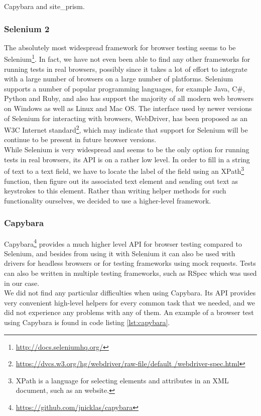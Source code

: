 Capybara and site\_prism.

\subsubsection{Selenium 2}
The absolutely most widespread framework for browser testing seems to be
Selenium\footnote{\url{http://docs.seleniumhq.org/}}. In fact, we have
not even been able to find any other frameworks for running tests in
real browsers, possibly since it takes a lot of effort to integrate with
a large number of browsers on a large number of platforms. Selenium
supports a number of popular programming languages, for example Java,
C\#, Python and Ruby, and also has support the majority of all modern web
browsers on Windows as well as Linux and Mac OS. The interface used by
newer versions of Selenium for interacting with browsers, WebDriver, has
been proposed as an W3C Internet
standard\footnote{\url{https://dvcs.w3.org/hg/webdriver/raw-file/default
/webdriver-spec.html}}, which may indicate that support for Selenium
will be continue to be present in future browser versions.
\cite{wiki:selenium}\\

While Selenium is very widespread and seems to be the only option for
running tests in real browsers, its API is on a rather low level. In
order to fill in a string of text to a text field, we have to locate the
label of the field using an XPath\footnote{XPath is a language for
selecting elements and attributes in an XML document, such as an
website.} function, then figure out its associated text element and
sending out text as keystrokes to this element. Rather than writing
helper methods for such functionality ourselves, we decided to use
a higher-level framework.\\


\subsubsection{Capybara}
Capybara\footnote{\url{https://github.com/jnicklas/capybara}} provides a
much higher level API for browser testing compared to Selenium, and
besides from using it with Selenium it can also be used with drivers for
headless browsers or for testing frameworks using mock requests. Tests
can also be written in multiple testing frameworks, such as RSpec which
was used in our case.\\

We did not find any particular difficulties when using Capybara. Its API
provides very convenient high-level helpers for every common task that
we needed, and we did not experience any problems with any of them. An
example of a browser test using Capybara is found in code listing
\ref{lst:capybara}.\\


